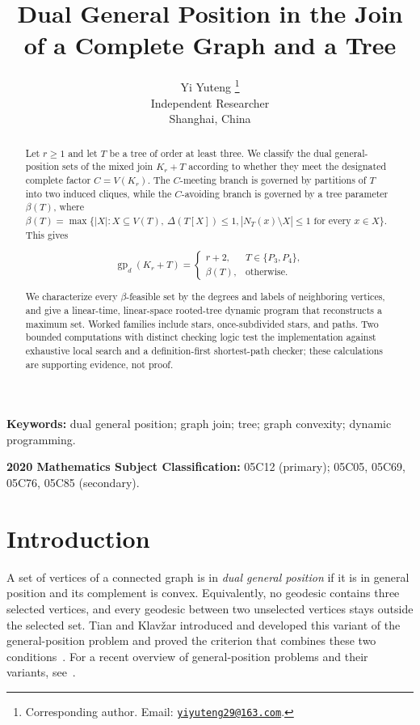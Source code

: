 \documentclass[11pt,a4paper]{article}
\title{Dual General Position in the Join of a Complete Graph and a Tree}
\author{%
  Yi Yuteng%
  \thanks{Corresponding author. Email:
  \href{mailto:yiyuteng29@163.com}{\texttt{yiyuteng29@163.com}}.}\\
  \small Independent Researcher\\
  \small Shanghai, China}
\date{}
\numberwithin{equation}{section}
\begin{document}
\maketitle
\linenumbers

\begin{abstract}

Let \(r\ge 1\) and let \(T\) be a tree of order at least three. We
classify the dual general-position sets of the mixed join \(K_r+T\)
according to whether they meet the designated complete factor
\(C=V(K_r)\). The \(C\)-meeting
branch is governed by partitions of \(T\) into two induced cliques,
while the \(C\)-avoiding branch is governed by a tree parameter
\(\beta(T)\), where
\(\beta(T)=\max\{|X|:X\subseteq V(T),\ \Delta(T[X])\le 1,
|N_T(x)\setminus X|\le 1\text{ for every }x\in X\}\). This gives

\[
\operatorname{gp}_d(K_r+T)=
\begin{cases}
r+2,&T\in\{P_3,P_4\},\\
\beta(T),&\text{otherwise}.
\end{cases}
\]

We characterize every \(\beta\)-feasible set by the degrees and labels
of neighboring vertices, and give a linear-time, linear-space
rooted-tree dynamic program that reconstructs a maximum set. Worked
families include stars, once-subdivided stars, and paths. Two bounded
computations with distinct checking logic test the implementation against
exhaustive local search and a definition-first shortest-path checker; these
calculations are supporting evidence, not proof.
\end{abstract}

\noindent\textbf{Keywords:} dual general position; graph join; tree;
graph convexity; dynamic programming.

\medskip
\noindent\textbf{2020 Mathematics Subject Classification:}
05C12 (primary); 05C05, 05C69, 05C76, 05C85 (secondary).

\section{Introduction}\label{sec:introduction}

A set of vertices of a connected graph is in \emph{dual general
position} if it is in general position and its complement is convex.
Equivalently, no geodesic contains three selected vertices, and every
geodesic between two unselected vertices stays outside the selected set.
Tian and Klav\v{z}ar introduced and developed this variant of the
general-position problem and proved the criterion that combines these
two conditions~\cite{tian-klavzar-variety}. For a recent overview of
general-position problems and their variants, see~\cite{chandran-et-al-survey}.
\end{document}
